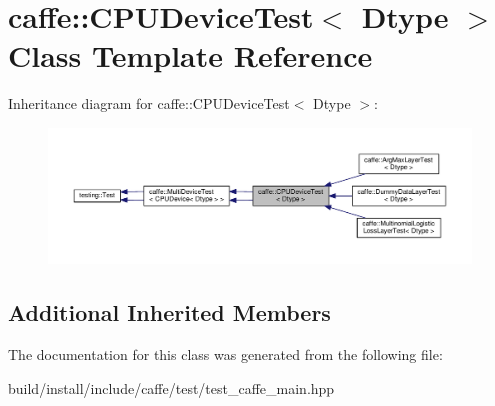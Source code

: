 \hypertarget{classcaffe_1_1_c_p_u_device_test}{}\section{caffe\+:\+:C\+P\+U\+Device\+Test$<$ Dtype $>$ Class Template Reference}
\label{classcaffe_1_1_c_p_u_device_test}


Inheritance diagram for caffe\+:\+:C\+P\+U\+Device\+Test$<$ Dtype $>$\+:
\nopagebreak
\begin{figure}[H]
\begin{center}
\leavevmode
\includegraphics[width=350pt]{classcaffe_1_1_c_p_u_device_test__inherit__graph}
\end{center}
\end{figure}
\subsection*{Additional Inherited Members}


The documentation for this class was generated from the following file\+:\begin{DoxyCompactItemize}
\item 
build/install/include/caffe/test/test\+\_\+caffe\+\_\+main.\+hpp\end{DoxyCompactItemize}
